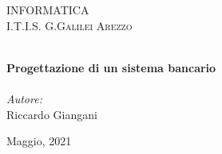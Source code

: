 
\begin{titlepage}
\vbox{ }
\vbox{ }
\begin{center}
\textsc{\LARGE INFORMATICA}\\[1.5cm]
\textsc{\Large I.T.I.S. G.Galilei Arezzo}\\[0.5cm]
\vbox{ }

\HRule \\[0.4cm]
{ \huge \bfseries Progettazione di un sistema bancario}\\[0.4cm]
\HRule \\[1.5cm]

\large
\emph{Autore:}\\
Riccardo Giangani
\vfill

{\large Maggio, 2021}
\end{center}
\end{titlepage}